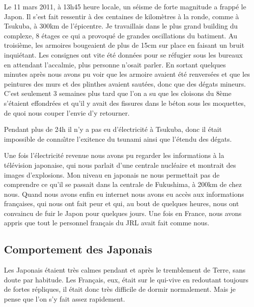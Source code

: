 \documentclass[journal]{RapportFR}
\begin{document}
\begin{CJK*}{UTF8}{min}
Le 11 mars 2011, \`a 13h45 heure locale, un s\'eisme de forte magnitude a frapp\'e le Japon. Il s'est fait ressentir \`a des centaines de kilom\`etres \`a la ronde, comme \`a Tsukuba, \`a 300km de l'\'epicentre. Je travaillais dans le plus grand building du complexe, 8 \'etages ce qui a provoqu\'e de grandes oscillations du batiment. Au troisi\`eme, les armoires bougeaient de plus de 15cm sur place en faisant un bruit inqui\'etant. Les consignes ont vite \'et\'e donn\'ees pour se r\'efugier sous les bureaux en attendant l'accalmie, plus personne n'osait parler.
En sortant quelques minutes apr\`es nous avons pu voir que les armoire avaient \'et\'e renvers\'ees et que les peintures des murs et des plinthes avaient saut\'ees, donc que des d\'egats mineurs. C'est seulement 3 semaines plus tard que l'on a su que les cloisons du 8{\`eme} s'\'etaient effondr\'ees et qu'il y avait des fissures dans le b\'eton sous les moquettes, de quoi nous couper l'envie d'y retourner.

Pendant plus de 24h il n'y a pas eu d'\'electricit\'e \`a Tsukuba, donc il \'etait impossible de conna\^\i tre l'exitence du tsunami ainsi que l'\'etendu des d\'egats.

Une fois l'\'electricit\'e revenue nous avons pu regarder les informations \`a la t\'el\'evision japonaise, qui nous parlait d'une centrale nucl\'eaire et montrait des images d'explosions. Mon niveau en japonais ne nous permettait pas de comprendre ce qu'il se passait dans la centrale de Fukushima, \`a 200km de chez nous. Quand nous avons enfin eu internet nous avons eu acc\`es aux informations fran\c caises, qui nous ont fait peur et qui, au bout de quelques heures, nous ont convaincu de fuir le Japon pour quelques jours.
Une fois en France, nous avons appris que tout le personnel fran\c cais du JRL avait fait comme nous.


\subsection{Comportement des Japonais}

Les Japonais \'etaient tr\`es calmes pendant et apr\`es le tremblement de Terre, sans doute par habitude. Les Fran\c cais, eux, \'etait sur le qui-vive en redoutant toujours de fortes r\'epliques, il \'etait donc tr\`es difficile de dormir normalement. Mais je pense que l'on s'y fait assez rapidement.


\end{CJK*}
\end{document}
